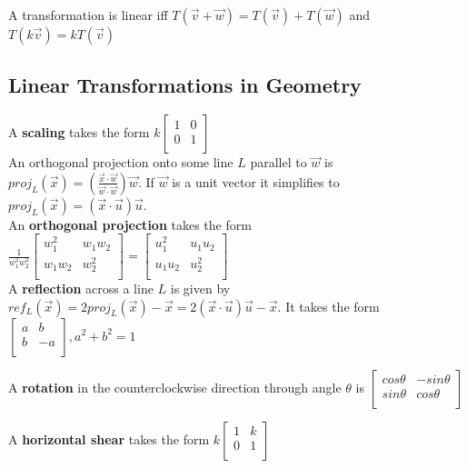 \documentclass[]{scrartcl}
\begin{document}
	A transformation is linear iff $T(\vec{v} + \vec{w}) = T(\vec{v}) + T(\vec{w})$ and $T(k\vec{v}) = kT(\vec{v})$
	 
	\subsection{Linear Transformations in Geometry}
	A \textbf{scaling} takes the form $k\begin{bmatrix}
	1 & 0 \\
	0 & 1 \\
	\end{bmatrix}$\\
	
	An orthogonal projection onto some line $L$ parallel to $\vec{w}$ is $proj_L(\vec{x}) = (\frac{\vec{x} \cdot \vec{w}}{\vec{w} \cdot \vec{w}}) \vec{w}$. If $\vec{w}$ is a unit vector it simplifies to $proj_L(\vec{x}) = (\vec{x} \cdot \vec{u})\vec{u}$.\\
	
	An \textbf{orthogonal projection} takes the form $\frac{1}{w_1^2 w_2^2} \begin{bmatrix}
	w_1^2 & w_1w_2 \\
	w_1w_2 & w_2^2 \\
	\end{bmatrix} = \begin{bmatrix}
	u_1^2 & u_1u_2 \\
	u_1u_2 & u_2^2 \\
	\end{bmatrix} $\\
	
	A \textbf{reflection} across a line $L$ is given by $ref_L(\vec{x}) = 2 proj_L(\vec{x}) - \vec{x} = 2(\vec{x} \cdot \vec{u})\vec{u} - \vec{x}$. It takes the form $\begin{bmatrix}
		a & b \\
		b & -a \\
	\end{bmatrix}, a^2 + b^2 = 1$
	
	A \textbf{rotation} in the counterclockwise direction through angle $\theta$ is
	$\begin{bmatrix}
	cos\theta & -sin\theta \\
	sin\theta & cos\theta \\
	\end{bmatrix}$
	
	A \textbf{horizontal shear} takes the form $k\begin{bmatrix}
	1 & k \\
	0 & 1 \\
	\end{bmatrix}$\\
	
\end{document}
